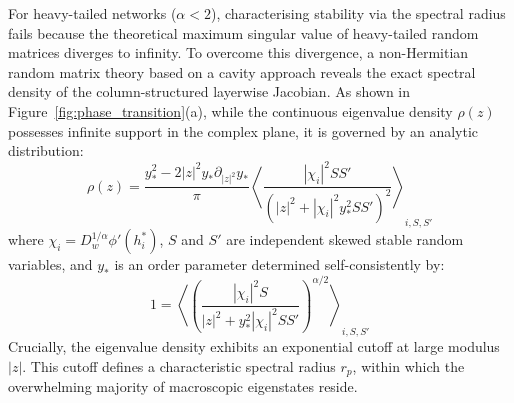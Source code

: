 \documentclass[11pt,oneside]{report}
\begin{document}
For heavy-tailed networks ($\alpha < 2$), characterising stability via the spectral radius fails because the theoretical maximum singular value of heavy-tailed random matrices diverges to infinity. To overcome this divergence, a non-Hermitian random matrix theory based on a cavity approach reveals the exact spectral density of the column-structured layerwise Jacobian. As shown in Figure~\ref{fig:phase_transition}(a), while the continuous eigenvalue density $\rho(z)$ possesses infinite support in the complex plane, it is governed by an analytic distribution:
\begin{equation}
	\rho(z) = \frac{y_*^2 - 2|z|^2 y_* \partial_{|z|^2} y_*}{\pi} \left\langle \frac{|\chi_i|^2 S S'}{\left(|z|^2 + |\chi_i|^2 y_*^2 S S'\right)^2} \right\rangle_{i, S, S'}
\end{equation}
where $\chi_i = D_w^{1/\alpha} \phi'(h_i^*)$, $S$ and $S'$ are independent skewed stable random variables, and $y_*$ is an order parameter determined self-consistently by:
\begin{equation}
	1 = \left\langle \left( \frac{|\chi_i|^2 S}{|z|^2 + y_*^2 |\chi_i|^2 S S'} \right)^{\alpha/2} \right\rangle_{i, S, S'}
\end{equation}
Crucially, the eigenvalue density exhibits an exponential cutoff at large modulus $|z|$. This cutoff defines a characteristic spectral radius $r_p$, within which the overwhelming majority of macroscopic eigenstates reside.
\end{document}
